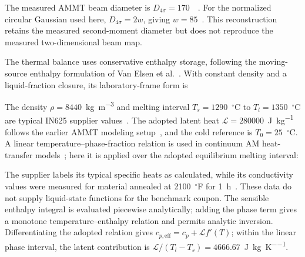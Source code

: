 
The measured AMMT beam diameter is $D_{4\sigma}=170$~\um~\cite{lane2020}. For the normalized circular Gaussian used here, $D_{4\sigma}=2w$, giving $w=85$~\um. This reconstruction retains the measured second-moment diameter but does not reproduce the measured two-dimensional beam map.

The thermal balance uses conservative enthalpy storage, following the moving-source enthalpy formulation of Van Elsen et al.~\cite{vanelsen2007}. With constant density and a liquid-fraction closure, its laboratory-frame form is

The density $\rho=8440$~\si{\kilogram\per\cubic\metre} and melting interval $T_s=1290$~$^\circ$C to $T_l=1350$~$^\circ$C are typical IN625 supplier values~\cite{specialmetals625}. The adopted latent heat $\mathcal L=280000$~\si{\joule\per\kilogram} follows the earlier AMMT modeling setup~\cite{kollmannsberger2019}, and the cold reference is $T_0=25$~$^\circ$C. A linear temperature--phase-fraction relation is used in continuum AM heat-transfer models~\cite{dynamic2024}; here it is applied over the adopted equilibrium melting interval:

The supplier labels its typical specific heats as calculated, while its conductivity values were measured for material annealed at 2100~$^\circ$F for 1~h~\cite{specialmetals625}. These data do not supply liquid-state functions for the benchmark coupon. The sensible enthalpy integral is evaluated piecewise analytically; adding the phase term gives a monotone temperature--enthalpy relation and permits analytic inversion. Differentiating the adopted relation gives $c_{p,\mathrm{eff}}=c_p+\mathcal L f'(T)$; within the linear phase interval, the latent contribution is $\mathcal L/(T_l-T_s)=4666.67$~\si{\joule\per\kilogram\per\kelvin}.

